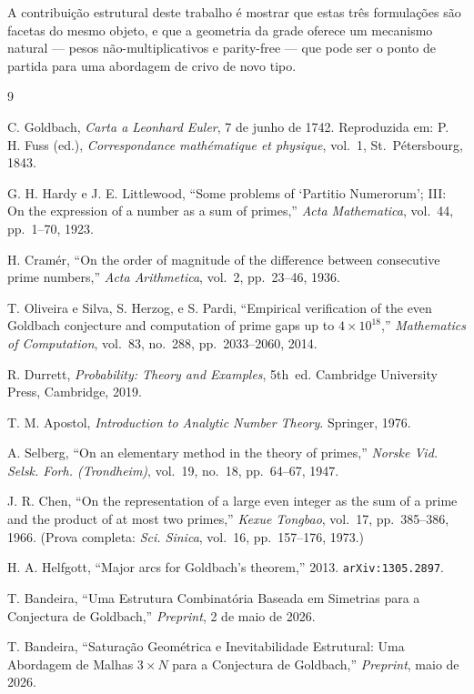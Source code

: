\documentclass[12pt,a4paper]{article}
\theoremstyle{remark}
\begin{document}
	A contribui\c{c}\~ao estrutural deste trabalho \'e mostrar que estas tr\^es
	formula\c{c}\~oes s\~ao facetas do mesmo objeto, e que a geometria da grade
	oferece um mecanismo natural --- pesos n\~ao-multiplicativos e parity-free ---
	que pode ser o ponto de partida para uma abordagem de crivo de novo tipo.
	
	\begin{thebibliography}{9}
		
		C. Goldbach,
		\emph{Carta a Leonhard Euler}, 7 de junho de 1742.
		Reproduzida em: P. H. Fuss (ed.),
		\emph{Correspondance math\'ematique et physique}, vol.~1,
		St.~P\'etersbourg, 1843.
		
		G. H. Hardy e J. E. Littlewood,
		``Some problems of `Partitio Numerorum'; III: On the expression of
		a number as a sum of primes,''
		\emph{Acta Mathematica}, vol.~44, pp.~1--70, 1923.
		
		H. Cram\'er,
		``On the order of magnitude of the difference between consecutive prime numbers,''
		\emph{Acta Arithmetica}, vol.~2, pp.~23--46, 1936.
		
		T. Oliveira e Silva, S. Herzog, e S. Pardi,
		``Empirical verification of the even Goldbach conjecture and computation of prime gaps
		up to $4\times 10^{18}$,''
		\emph{Mathematics of Computation}, vol.~83, no.~288, pp.~2033--2060, 2014.
		
		R. Durrett,
		\emph{Probability: Theory and Examples}, 5th~ed.
		Cambridge University Press, Cambridge, 2019.
		
		T. M. Apostol,
		\emph{Introduction to Analytic Number Theory}.
		Springer, 1976.
		
		A. Selberg,
		``On an elementary method in the theory of primes,''
		\emph{Norske Vid. Selsk. Forh. (Trondheim)}, vol.~19, no.~18, pp.~64--67, 1947.
		
		J. R. Chen,
		``On the representation of a large even integer as the sum of a prime and the product
		of at most two primes,''
		\emph{Kexue Tongbao}, vol.~17, pp.~385--386, 1966.
		(Prova completa: \emph{Sci. Sinica}, vol.~16, pp.~157--176, 1973.)
		
		H. A. Helfgott,
		``Major arcs for Goldbach's theorem,'' 2013.
		\texttt{arXiv:1305.2897}.
		
		T. Bandeira,
		``Uma Estrutura Combinat\'oria Baseada em Simetrias para a Conjectura de Goldbach,''
		\emph{Preprint}, 2 de maio de 2026.
		
		T. Bandeira,
		``Satura\c{c}\~ao Geom\'etrica e Inevitabilidade Estrutural:
		Uma Abordagem de Malhas $3\times N$ para a Conjectura de Goldbach,''
		\emph{Preprint}, maio de 2026.
		
	\end{thebibliography}
	
\end{document}

